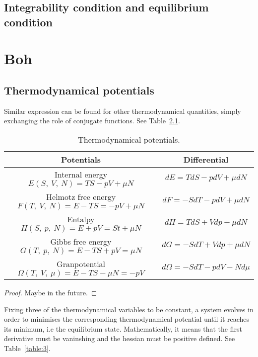 \section{Integrability condition and equilibrium condition}


\chapter{Boh}

\section{Thermodynamical potentials}











    Similar expression can be found for other thermodynamical quantities, simply exchanging the role of conjugate functions. See Table~\ref{table:2}.

    \begin{table}[h!]
        \centering
        \begin{tabular}{c | c}
        Potentials & Differential \\
        \hline
        Internal energy $E(S, ~V, ~N) = TS - pV + \mu N$ & $dE = TdS - pdV + \mu dN$ \\ 
        Helmotz free energy $F(T, ~V, ~N) = E - TS = -pV + \mu N$ & $dF = -SdT - pdV + \mu dN$ \\ 
        Entalpy $H(S, ~p, ~N) = E + pV = St + \mu N$ & $dH = TdS + Vdp + \mu dN$ \\ 
        Gibbs free energy $G(T, ~p, ~N) = E - TS + pV = \mu N$ & $dG = -SdT + V dp + \mu dN$ \\ 
        Granpotential $\Omega (T, ~V, ~\mu) = E - TS - \mu N = -pV$ & $d\Omega = -SdT - pdV - N d \mu$ \\ 
        \end{tabular}
    \caption{Thermodynamical potentials.}
    \label{table:2}
    \end{table}

    \begin{proof}
        Maybe in the future.
    \end{proof}

    Fixing three of the thermodynamical variables to be constant, a system evolves in order to minimises the corresponding thermodynamical potential until it reaches its minimum, i.e the equilibrium state. Mathematically, it means that the first derivative must be vaninshing and the hessian must be positive defined. See Table~\ref{table:3}.

